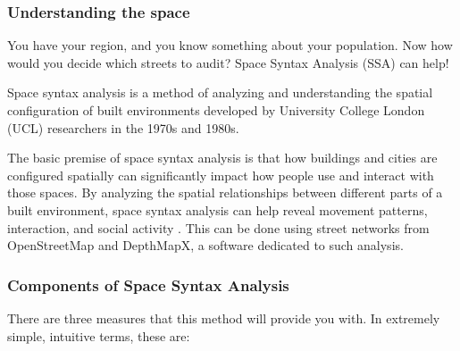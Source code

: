 \documentclass[
]{latex/krantz}
\begin{document}

\hypertarget{understanding-the-space}{%
\subsubsection{Understanding the space}\label{understanding-the-space}}

You have your region, and you know something about your population. Now how would you decide which streets to audit? Space Syntax Analysis (SSA) can help!

Space syntax analysis is a method of analyzing and understanding the spatial configuration of built environments developed by University College London (UCL) researchers in the 1970s and 1980s.

The basic premise of space syntax analysis is that how buildings and cities are configured spatially can significantly impact how people use and interact with those spaces. By analyzing the spatial relationships between different parts of a built environment, space syntax analysis can help reveal movement patterns, interaction, and social activity \autocite{vannesIntroductionSpaceSyntax2021}. This can be done using street networks from OpenStreetMap and DepthMapX, a software dedicated to such analysis.

\hypertarget{components-of-space-syntax-analysis}{%
\subsubsection{Components of Space Syntax Analysis}\label{components-of-space-syntax-analysis}}

There are three measures that this method will provide you with. In extremely simple, intuitive terms, these are:
\end{document}
